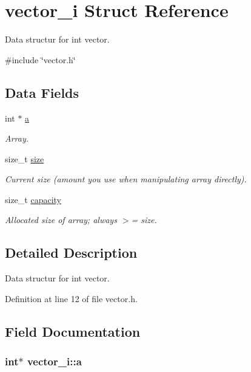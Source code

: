 \hypertarget{structvector__i}{\section{vector\-\_\-i \-Struct \-Reference}
\label{structvector__i}
}


\-Data structur for int vector.  




{\ttfamily \#include \char`\"{}vector.\-h\char`\"{}}

\subsection*{\-Data \-Fields}
\begin{DoxyCompactItemize}
\item 
int $\ast$ \hyperlink{structvector__i_a1f7c0e586cb1e09323dec3dd48d13882}{a}
\begin{DoxyCompactList}\small\item\em \-Array. \end{DoxyCompactList}\item 
size\-\_\-t \hyperlink{structvector__i_a8df52068982f4b7dcaa024b37f243282}{size}
\begin{DoxyCompactList}\small\item\em \-Current size (amount you use when manipulating array directly). \end{DoxyCompactList}\item 
size\-\_\-t \hyperlink{structvector__i_a8e7421832635519ee2ccebd19298b705}{capacity}
\begin{DoxyCompactList}\small\item\em \-Allocated size of array; always $>$= size. \end{DoxyCompactList}\end{DoxyCompactItemize}


\subsection{\-Detailed \-Description}
\-Data structur for int vector. 



\-Definition at line 12 of file vector.\-h.



\subsection{\-Field \-Documentation}
\hypertarget{structvector__i_a1f7c0e586cb1e09323dec3dd48d13882}{
\subsubsection[{a}]{\setlength{\rightskip}{0pt plus 5cm}int$\ast$ {\bf vector\-\_\-i\-::a}}}\label{structvector__i_a1f7c0e586cb1e09323dec3dd48d13882}


